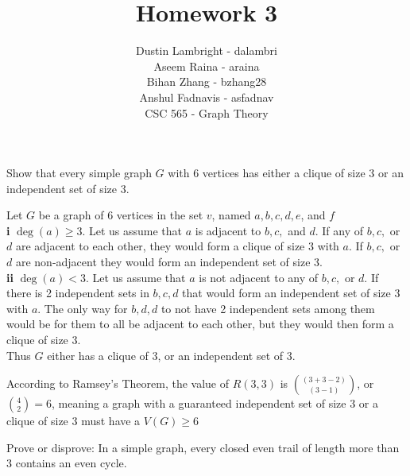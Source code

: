 \documentclass[12pt]{article}
\newenvironment{question}[2][Question]{\begin{trivlist}
\item[\hskip \labelsep {\bfseries #1}\hskip \labelsep {\bfseries #2.}]}{\end{trivlist}}
\begin{document}


\title{Homework 3}%
\author{Dustin Lambright - dalambri \\ Aseem Raina - araina \\ Bihan Zhang - bzhang28 \\ Anshul Fadnavis - asfadnav\\
CSC 565 - Graph Theory} %

\maketitle


\begin{question}{1}
Show that every simple graph $G$ with 6 vertices has either a clique of size 3 or an independent
set of size 3.
\end{question}

Let $G$ be a graph of 6 vertices in the set $v$, named $a, b, c, d, e$, and $f$ \\ 

\textbf{i} $\deg(a) \geq 3$. Let us assume that $a$ is adjacent to $b, c,$ and $d$. If any of $b, c,$ or $d$ are adjacent to each other, they would form a clique of size 3 with $a$. If $b, c,$ or $d$ are non-adjacent they would form an independent set of size 3.\\

\textbf{ii} $\deg(a) < 3$. Let us assume that $a$ is not adjacent to any of $b, c,$ or $d$. If there is 2 independent sets in $b, c, d$ that would form an independent set of size 3 with $a$. The only way for $b,d,d$ to not have 2 independent sets among them would be for them to all be adjacent to each other, but they would then form a clique of size 3.\\

Thus $G$ either has a clique of 3, or an independent set of 3. 

According to Ramsey's Theorem, the value of $R(3,3)$ is ${(3+3-2) \choose (3-1)}$, or ${4 \choose 2} = 6$, meaning a graph with a guaranteed independent set of size 3 or a clique of size 3 must have a $V(G) \geq 6$ \\

\begin{question}{2}
Prove or disprove: In a simple graph, every closed even trail of length more than 3 contains an even cycle.
\end{question}
\end{document}

